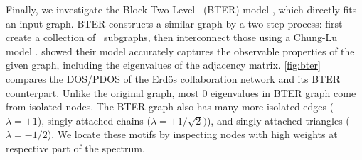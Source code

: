 Finally, we investigate the Block Two-Level \ErdosRenyi\ (BTER) model 
\cite{seshadhri2012community}, which directly fits an input graph. BTER
constructs a similar graph by a two-step process: first create a collection of
\ErdosRenyi\ subgraphs, then interconnect those using a Chung-Lu model  
\cite{chung2002connected}. \citeauthor{seshadhri2012community} showed their
model accurately captures the observable properties of the given graph,
including the eigenvalues of the adjacency matrix. \cref{fig:bter} compares the
DOS/PDOS of the Erd\"{o}s collaboration network and its BTER counterpart. Unlike
the original graph, most $0$ eigenvalues in BTER graph come from isolated nodes.
The BTER graph also has many more isolated edges ($\lambda=\pm1$),
singly-attached chains ($\lambda=\pm1/\sqrt{2})$), and singly-attached triangles
($\lambda=-1/2$). We locate these motifs by inspecting nodes with high weights
at respective part of the spectrum.

